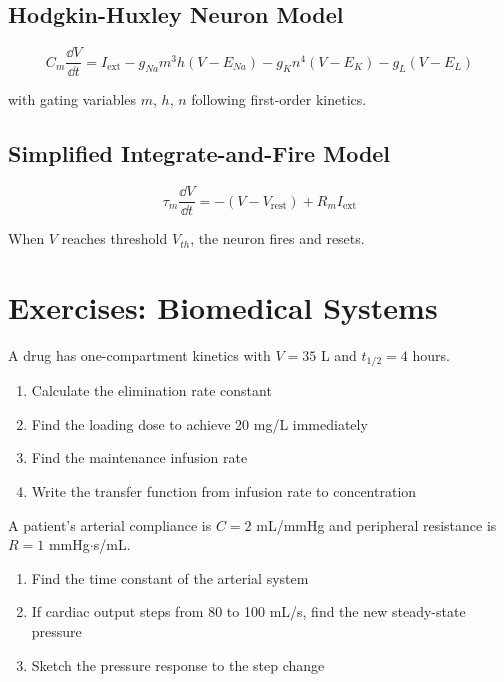 \subsection{Hodgkin-Huxley Neuron Model}

\begin{equation}
C_m\frac{\dd V}{\dd t} = I_{\text{ext}} - g_{Na}m^3h(V - E_{Na}) - g_K n^4(V - E_K) - g_L(V - E_L)
\end{equation}

with gating variables $m$, $h$, $n$ following first-order kinetics.

\subsection{Simplified Integrate-and-Fire Model}

\begin{equation}
\tau_m\frac{\dd V}{\dd t} = -(V - V_{\text{rest}}) + R_m I_{\text{ext}}
\end{equation}

When $V$ reaches threshold $V_{th}$, the neuron fires and resets.

\section{Exercises: Biomedical Systems}

\begin{exercise}
A drug has one-compartment kinetics with $V = 35$ L and $t_{1/2} = 4$ hours.
\begin{enumerate}[label=(\alph*)]
    \item Calculate the elimination rate constant
    \item Find the loading dose to achieve 20 mg/L immediately
    \item Find the maintenance infusion rate
    \item Write the transfer function from infusion rate to concentration
\end{enumerate}
\end{exercise}

\begin{exercise}
A patient's arterial compliance is $C = 2$ mL/mmHg and peripheral resistance is $R = 1$ mmHg$\cdot$s/mL.
\begin{enumerate}[label=(\alph*)]
    \item Find the time constant of the arterial system
    \item If cardiac output steps from 80 to 100 mL/s, find the new steady-state pressure
    \item Sketch the pressure response to the step change
\end{enumerate}
\end{exercise}

